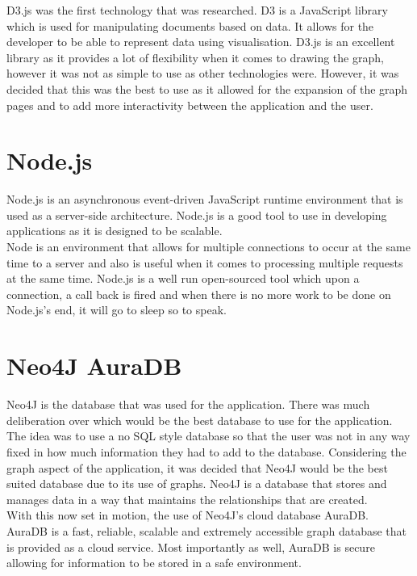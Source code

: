 D3.js was the first technology that was researched. D3 is a JavaScript library which is used for manipulating documents based on data. It allows for the developer to be able to represent data using visualisation.\cite{D3.js} D3.js is an excellent library as it provides a lot of flexibility when it comes to drawing the graph, however it was not as simple to use as other technologies were. However, it was decided that this was the best to use as it allowed for the expansion of the graph pages and to add more interactivity between the application and the user. \\

\section{Node.js}

Node.js is an asynchronous event-driven JavaScript runtime environment that is used as a server-side architecture. Node.js is a good tool to use in developing applications as it is designed to be scalable.\cite{Node.js}\\

Node is an environment that allows for multiple connections to occur at the same time to a server and also is useful when it comes to processing multiple requests at the same time. Node.js is a well run open-sourced tool which upon a connection, a call back is fired and when there is no more work to be done on Node.js’s end, it will go to sleep so to speak.\cite{Node.js}\\ 

\section{Neo4J AuraDB}

Neo4J is the database that was used for the application. There was much deliberation over which would be the best database to use for the application. The idea was to use a no SQL style database so that the user was not in any way fixed in how much information they had to add to the database. Considering the graph aspect of the application, it was decided that Neo4J would be the best suited database due to its use of graphs. Neo4J is a database that stores and manages data in a way that maintains the relationships that are created. \cite{Neo4J}\\

With this now set in motion, the use of Neo4J’s cloud database AuraDB. AuraDB is a fast, reliable, scalable and extremely accessible graph database that is provided as a cloud service. Most importantly as well, AuraDB is secure allowing for information to be stored in a safe environment.\cite{Neo4J2}\\

